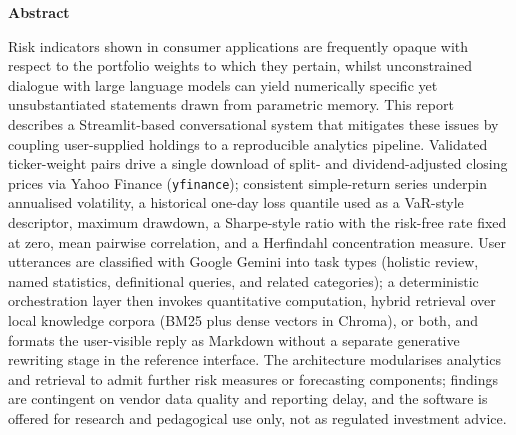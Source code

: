 \documentclass[12pt]{article}
\begin{document}
\begin{titlepage}
    \begin{minipage}{0.9\textwidth}
\small
\begin{center}
\textbf{Abstract}
\end{center}

Risk indicators shown in consumer applications are frequently opaque with respect to the portfolio weights to which they pertain, whilst unconstrained dialogue with large language models can yield numerically specific yet unsubstantiated statements drawn from parametric memory. This report describes a Streamlit-based conversational system that mitigates these issues by coupling user-supplied holdings to a reproducible analytics pipeline. Validated ticker-weight pairs drive a single download of split- and dividend-adjusted closing prices via Yahoo Finance (\texttt{yfinance}); consistent simple-return series underpin annualised volatility, a historical one-day loss quantile used as a VaR-style descriptor, maximum drawdown, a Sharpe-style ratio with the risk-free rate fixed at zero, mean pairwise correlation, and a Herfindahl concentration measure. User utterances are classified with Google Gemini into task types (holistic review, named statistics, definitional queries, and related categories); a deterministic orchestration layer then invokes quantitative computation, hybrid retrieval over local knowledge corpora (BM25 plus dense vectors in Chroma), or both, and formats the user-visible reply as Markdown without a separate generative rewriting stage in the reference interface. The architecture modularises analytics and retrieval to admit further risk measures or forecasting components; findings are contingent on vendor data quality and reporting delay, and the software is offered for research and pedagogical use only, not as regulated investment advice.

\end{minipage}

    \vfill
\end{titlepage}

\tableofcontents
\newpage















\end{document}
